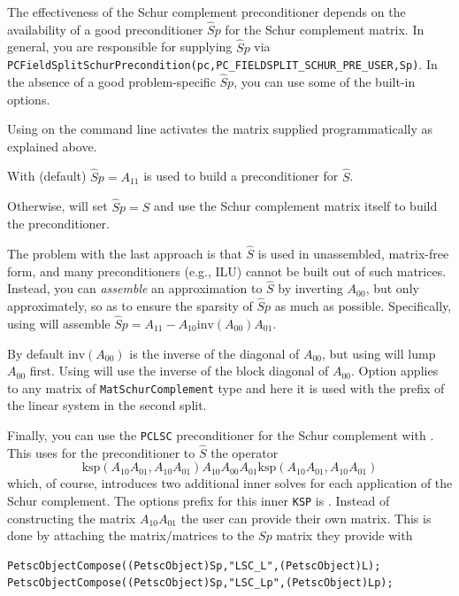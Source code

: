 The effectiveness of the Schur complement preconditioner depends on the availability of a good preconditioner $\hat Sp$ for the Schur complement matrix.
In general, you are responsible for supplying $\hat Sp$ via
\lstinline{PCFieldSplitSchurPrecondition(pc,PC_FIELDSPLIT_SCHUR_PRE_USER,Sp)}.
In the absence of a good
problem-specific $\hat Sp$, you can use some of the built-in options.

Using  on the command line activates
the matrix supplied programmatically as explained above.

With  (default) $\hat Sp = A_{11}$ is used to build a
preconditioner for $\hat S$.

Otherwise,  will set $\hat Sp = \hat S$ and use the Schur complement matrix itself to build the preconditioner.

The problem with the last approach is that $\hat S$ is used in unassembled, matrix-free form, and many preconditioners (e.g., ILU) cannot be built out of
such matrices. Instead, you can \emph{assemble}  an approximation to $\hat S$ by inverting $A_{00}$, but only approximately, so as to ensure the sparsity of $\hat Sp$ as much as possible.
Specifically, using  will assemble $\hat Sp = A_{11} - A_{10} \text{inv}(A_{00}) A_{01}$.

By default $\text{inv}(A_{00})$ is the inverse of the diagonal of $A_{00}$, but using  will
lump $A_{00}$ first. Using  will use the inverse of the block diagonal of $A_{00}$.
Option  applies to any matrix of \lstinline{MatSchurComplement} type and here it is used with the prefix
 of the linear system in the second split.

Finally, you can use the \lstinline{PCLSC} preconditioner for the Schur complement with . This uses for the preconditioner to $\hat{S}$ the operator
\[
  \text{ksp}(A_{10} A_{01},A_{10} A_{01}) A_{10} A_{00} A_{01} \text{ksp}(A_{10} A_{01},A_{10} A_{01})
\]
 which, of course, introduces two additional inner solves for each application of the Schur complement. The options prefix for this inner \lstinline{KSP} is . Instead of constructing the matrix $A_{10} A_{01}$ the user can provide their own matrix. This is done by attaching the matrix/matrices to the $ Sp $ matrix they provide with
\begin{lstlisting}
PetscObjectCompose((PetscObject)Sp,"LSC_L",(PetscObject)L);
PetscObjectCompose((PetscObject)Sp,"LSC_Lp",(PetscObject)Lp);
\end{lstlisting}

